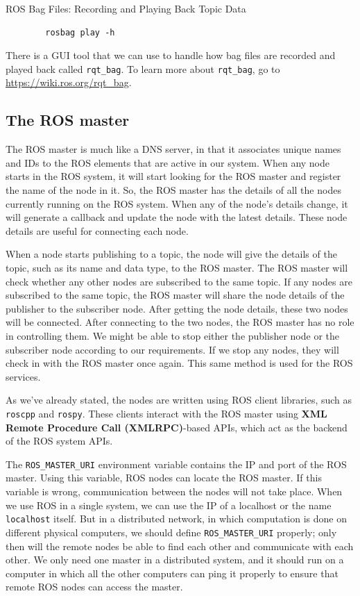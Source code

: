 \documentclass[../../main]{subfiles}
\begin{document}
\begin{codebox}[]{ROS Bag Files: Recording and Playing Back Topic Data}
    
    \begin{verbatim}
        rosbag play -h
    \end{verbatim}
    \end{codebox}

There is a GUI tool that we can use to handle how bag files are recorded and played back called \texttt{rqt\_bag}. To learn more about \texttt{rqt\_bag}, go to \url{https://wiki.ros.org/rqt_bag}.

\subsection{The ROS master}
The ROS master is much like a DNS server, in that it associates unique names and IDs to the ROS elements that are active in our system. When any node starts in the ROS system, it will start looking for the ROS master and register the name of the node in it. So, the ROS master has the details of all the nodes currently running on the ROS system. When any of the node's details change, it will generate a callback and update the node with the latest details. These node details are useful for connecting each node.

When a node starts publishing to a topic, the node will give the details of the topic, such as its name and data type, to the ROS master. The ROS master will check whether any other nodes are subscribed to the same topic. If any nodes are subscribed to the same topic, the ROS master will share the node details of the publisher to the subscriber node. After getting the node details, these two nodes will be connected. After connecting to the two nodes, the ROS master has no role in controlling them. We might be able to stop either the publisher node or the subscriber node according to our requirements. If we stop any nodes, they will check in with the ROS master once again. This same method is used for the ROS services.

As we've already stated, the nodes are written using ROS client libraries, such as \texttt{roscpp} and \texttt{rospy}. These clients interact with the ROS master using \textbf{XML Remote Procedure Call (XMLRPC)}-based APIs, which act as the backend of the ROS system APIs.

The \texttt{ROS\_MASTER\_URI} environment variable contains the IP and port of the ROS master. Using this variable, ROS nodes can locate the ROS master. If this variable is wrong, communication between the nodes will not take place. When we use ROS in a single system, we can use the IP of a localhost or the name \texttt{localhost} itself. But in a distributed network, in which computation is done on different physical computers, we should define \texttt{ROS\_MASTER\_URI} properly; only then will the remote nodes be able to find each other and communicate with each other. We only need one master in a distributed system, and it should run on a computer in which all the other computers can ping it properly to ensure that remote ROS nodes can access the master.
\end{document}
